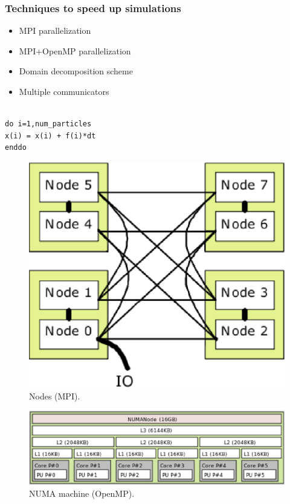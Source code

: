 \documentclass{beamer}
\begin{document}
\begin{frame}[fragile]\frametitle{Techniques to speed up simulations}


\begin{minipage}[t]{0.48\linewidth}
	\begin{itemize}
        \item MPI parallelization	
	\item MPI+OpenMP parallelization
	\item Domain decomposition scheme
	\item Multiple communicators
	\end{itemize}

\begin{verbatim} 

do i=1,num_particles 
x(i) = x(i) + f(i)*dt 
enddo 

\end{verbatim}

\end{minipage}
\hfill%
\begin{minipage}[t]{0.48\linewidth}

\begin{figure} \includegraphics[scale=0.3]{node_abisko.eps}
\caption{{\scriptsize  Nodes (MPI).}} \end{figure}

\begin{figure}
\includegraphics[scale=0.25]{lstopoabisko128G1CU_0.eps} \caption{{\scriptsize
NUMA machine (OpenMP).}} \end{figure}

\end{minipage}
\end{frame}
\end{document}
